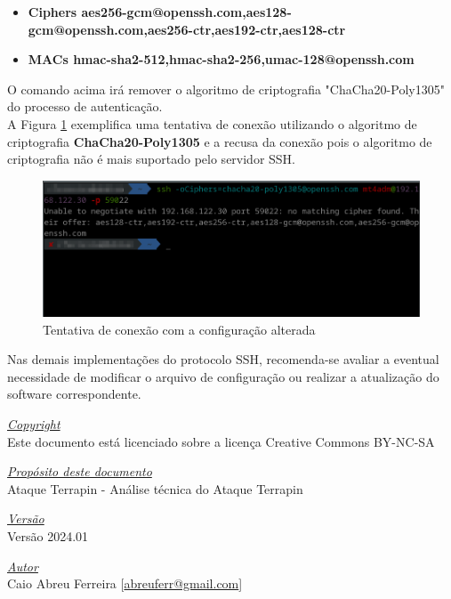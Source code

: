 \documentclass[12pt]{article}
\begin{document}
\begin{itemize}
	\item \textbf{Ciphers aes256-gcm@openssh.com,aes128-gcm@openssh.com,aes256-ctr,aes192-ctr,aes128-ctr}
	\item \textbf{MACs hmac-sha2-512,hmac-sha2-256,umac-128@openssh.com}
\end{itemize}

O comando acima irá remover o algoritmo de criptografia "ChaCha20-Poly1305" do processo de autenticação.\\

A Figura \ref{fig:terrapin_depois} exemplifica uma tentativa de conexão utilizando o algoritmo de criptografia \textbf{ChaCha20-Poly1305} e a recusa da conexão pois o algoritmo de criptografia não é mais suportado pelo servidor SSH.

\begin{figure}[H]
	\centering
	\includegraphics[scale=0.63]{terrapin_depois.png}
	\caption{Tentativa de conexão com a configuração alterada}
	\label{fig:terrapin_depois}
\end{figure}

Nas demais implementações do protocolo SSH, recomenda-se avaliar a eventual necessidade de modificar o arquivo de configuração ou realizar a atualização do software correspondente.

\pagebreak

\vspace*{\fill}
\begin{flushright}
	\underline{\textit{Copyright}}\\
	Este documento está licenciado sobre a licença Creative Commons BY-NC-SA\bigskip

	\underline{\textit{Propósito deste documento}}\\
	Ataque Terrapin - Análise técnica do Ataque Terrapin\bigskip

	\underline{\textit{Versão}}\\
	Versão 2024.01\bigskip

	\underline{\textit{Autor}}\\
	Caio Abreu Ferreira [\href{mailto:abreuferr@gmail.com}{abreuferr@gmail.com}] \bigskip\\
\end{flushright}
\end{document}
